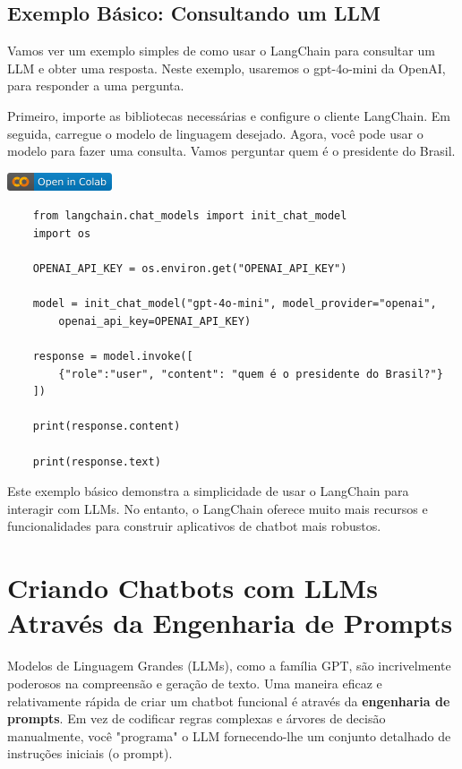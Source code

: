 \documentclass[14pt,a4paper,oneside]{book}
\begin{document}
\section{Exemplo Básico: Consultando um LLM}

Vamos ver um exemplo simples de como usar o LangChain para consultar um LLM e obter uma resposta. Neste exemplo, usaremos o gpt-4o-mini da OpenAI, para responder a uma pergunta.

Primeiro, importe as bibliotecas necessárias e configure o cliente LangChain. Em seguida, carregue o modelo de linguagem desejado. Agora, você pode usar o modelo para fazer uma consulta. Vamos perguntar quem é o presidente do Brasil.

\vspace{\baselineskip}
\href{https://colab.research.google.com/github/giseldo/chatbotbook_v2/blob/main/notebook/langchain.ipynb}{
  \includegraphics{fig/colab-badge.png}
}

\begin{verbatim}
	from langchain.chat_models import init_chat_model
	import os

	OPENAI_API_KEY = os.environ.get("OPENAI_API_KEY")

	model = init_chat_model("gpt-4o-mini", model_provider="openai", 
		openai_api_key=OPENAI_API_KEY)

	response = model.invoke([
		{"role":"user", "content": "quem é o presidente do Brasil?"}
	])

	print(response.content)

	print(response.text)
\end{verbatim}

Este exemplo básico demonstra a simplicidade de usar o LangChain para interagir com LLMs. No entanto, o LangChain oferece muito mais recursos e funcionalidades para construir aplicativos de chatbot mais robustos.


\chapter{Criando Chatbots com LLMs Através da Engenharia de Prompts}

Modelos de Linguagem Grandes (LLMs), como a família GPT, são incrivelmente poderosos na compreensão e geração de texto. Uma maneira eficaz e relativamente rápida de criar um chatbot funcional é através da \textbf{engenharia de prompts}. Em vez de codificar regras complexas e árvores de decisão manualmente, você "programa" o LLM fornecendo-lhe um conjunto detalhado de instruções iniciais (o prompt).
\end{document}

